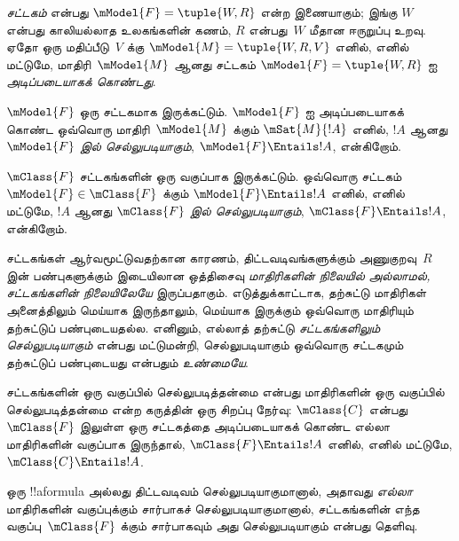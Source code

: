 \documentclass[../../../include/open-logic-section]{subfiles}
\begin{document}


\begin{defn}
  \emph{சட்டகம்} என்பது $\mModel{F} = \tuple{W,R}$ என்ற இணையாகும்; இங்கு
  $W$ என்பது காலியல்லாத உலகங்களின் கணம், $R$ என்பது~$W$ மீதான ஈருறுப்பு
  உறவு. ஏதோ ஒரு மதிப்பீடு~$V$ க்கு $\mModel{M} = \tuple{W, R, V}$ எனில்,
  எனில் மட்டுமே, மாதிரி~$\mModel{M}$ ஆனது சட்டகம் $\mModel{F} =
  \tuple{W,R}$ ஐ \emph{அடிப்படையாகக் கொண்டது}.
\end{defn}

\begin{defn}
  $\mModel{F}$ ஒரு சட்டகமாக இருக்கட்டும். $\mModel{F}$ ஐ அடிப்படையாகக் கொண்ட
  ஒவ்வொரு மாதிரி~$\mModel{M}$ க்கும் $\mSat{M}{!A}$ எனில்,
  $!A$ ஆனது \emph{$\mModel{F}$ இல் செல்லுபடியாகும்}, $\mModel{F}
  \Entails !A$, என்கிறோம்.

  $\mClass{F}$ சட்டகங்களின் ஒரு வகுப்பாக இருக்கட்டும். ஒவ்வொரு சட்டகம்
  $\mModel{F} \in \mClass{F}$ க்கும் $\mModel{F} \Entails !A$ எனில்,
  எனில் மட்டுமே, $!A$ ஆனது \emph{$\mClass{F}$ இல் செல்லுபடியாகும்},
  $\mClass{F} \Entails !A$, என்கிறோம்.
\end{defn}

சட்டகங்கள் ஆர்வமூட்டுவதற்கான காரணம், திட்டவடிவங்களுக்கும் அணுகுறவு~$R$ இன்
பண்புகளுக்கும் இடையிலான ஒத்திசைவு \emph{மாதிரிகளின் நிலையில் அல்லாமல்,
சட்டகங்களின் நிலையிலேயே} இருப்பதாகும். எடுத்துக்காட்டாக, தற்சுட்டு
மாதிரிகள் அனைத்திலும்  மெய்யாக இருந்தாலும்,  மெய்யாக இருக்கும்
ஒவ்வொரு மாதிரியும் தற்சுட்டுப் பண்புடையதல்ல. எனினும்,  எல்லாத்
தற்சுட்டு \emph{சட்டகங்களிலும்} \emph{செல்லுபடியாகும்} என்பது மட்டுமன்றி,
 செல்லுபடியாகும் ஒவ்வொரு சட்டகமும் தற்சுட்டுப் பண்புடையது என்பதும்
\emph{உண்மையே}.

\begin{rem}
சட்டகங்களின் ஒரு வகுப்பில் செல்லுபடித்தன்மை என்பது மாதிரிகளின் ஒரு வகுப்பில்
செல்லுபடித்தன்மை என்ற கருத்தின் ஒரு சிறப்பு நேர்வு: $\mClass{C}$ என்பது
$\mClass{F}$ இலுள்ள ஒரு சட்டகத்தை அடிப்படையாகக் கொண்ட எல்லா மாதிரிகளின்
வகுப்பாக இருந்தால், $\mClass{F} \Entails !A$ எனில், எனில் மட்டுமே,
$\mClass{C} \Entails !A$.

ஒரு !!a{formula} அல்லது திட்டவடிவம் செல்லுபடியாகுமானால், அதாவது
\emph{எல்லா} மாதிரிகளின் வகுப்புக்கும் சார்பாகச் செல்லுபடியாகுமானால்,
சட்டகங்களின் எந்த வகுப்பு~$\mClass{F}$ க்கும் சார்பாகவும் அது செல்லுபடியாகும்
என்பது தெளிவு.
\end{rem}
\end{document}
